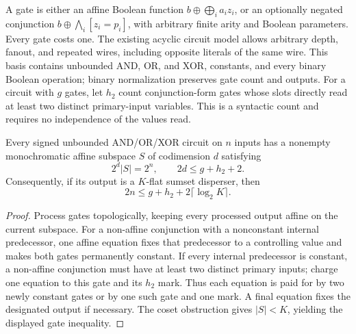 \begin{definition}
  \label{def:lowerbounds-algebraic-geometry-model}
  \leanok
  A gate is either an affine Boolean function
  $b\oplus\bigoplus_i a_i z_i$, or an optionally negated conjunction
  $b\oplus\bigwedge_i[z_i=p_i]$, with arbitrary finite arity and Boolean
  parameters. Every gate costs one. The existing acyclic circuit model allows
  arbitrary depth, fanout, and repeated wires, including opposite literals of
  the same wire. This basis contains unbounded AND, OR, and XOR, constants,
  and every binary Boolean operation; binary normalization preserves gate count
  and outputs. For a circuit with $g$ gates, let $h_2$ count conjunction-form
  gates whose slots directly read at least two distinct primary-input variables.
  This is a syntactic count and requires no independence of the values read.
\end{definition}

\begin{theorem}
  \label{thm:lowerbounds-algebraic-geometry-pairing}
  \leanok
  Every signed unbounded AND/OR/XOR circuit on $n$ inputs has a nonempty
  monochromatic affine subspace $S$ of codimension $d$ satisfying
  \[
    2^d|S|=2^n,\qquad 2d\le g+h_2+2.
  \]
  Consequently, if its output is a $K$-flat sumset disperser, then
  \[
    2n\le g+h_2+2\lceil\log_2K\rceil.
  \]
\end{theorem}
\begin{proof}
  \leanok
  Process gates topologically, keeping every processed output affine on the
  current subspace. For a non-affine conjunction with a nonconstant internal
  predecessor, one affine equation fixes that predecessor to a controlling
  value and makes both gates permanently constant. If every internal predecessor
  is constant, a non-affine conjunction must have at least two distinct primary
  inputs; charge one equation to this gate and its $h_2$ mark. Thus each equation
  is paid for by two newly constant gates or by one such gate and one mark.
  A final equation fixes the designated output if necessary. The coset
  obstruction gives $|S|<K$, yielding the displayed gate inequality.
\end{proof}

